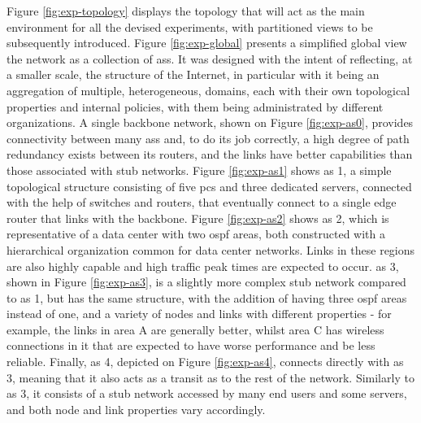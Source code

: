     Figure \ref{fig:exp-topology} displays the topology that will act as the main environment for all the devised experiments, with partitioned views to be subsequently introduced.
    Figure \ref{fig:exp-global} presents a simplified global view the network as a collection of \glspl{as}.
    It was designed with the intent of reflecting, at a smaller scale, the structure of the Internet, in particular with it being an aggregation of multiple, heterogeneous, domains, each with their own topological properties and internal policies, with them being administrated by different organizations.
    A single backbone network, shown on Figure \ref{fig:exp-as0}, provides connectivity between many \glspl{as} and, to do its job correctly, a high degree of path redundancy exists between its routers, and the links have better capabilities than those associated with stub networks.
    Figure \ref{fig:exp-as1} shows \gls{as} 1, a simple topological structure consisting of five \glspl{pc} and three dedicated servers, connected with the help of switches and routers, that eventually connect to a single edge router that links with the backbone.
    Figure \ref{fig:exp-as2} shows \gls{as} 2, which is representative of a data center with two \gls{ospf} areas, both constructed with a hierarchical organization common for data center networks.
    Links in these regions are also highly capable and high traffic peak times are expected to occur.
    \gls{as} 3, shown in Figure \ref{fig:exp-as3}, is a slightly more complex stub network compared to \gls{as} 1, but has the same structure, with the addition of having three \gls{ospf} areas instead of one, and a variety of nodes and links with different properties - for example, the links in area A are generally better, whilst area C has wireless connections in it that are expected to have worse performance and be less reliable.
    Finally, \gls{as} 4, depicted on Figure \ref{fig:exp-as4}, connects directly with \gls{as} 3, meaning that it also acts as a transit \gls{as} to the rest of the network.
    Similarly to \gls{as} 3, it consists of a stub network accessed by many end users and some servers, and both node and link properties vary accordingly.

